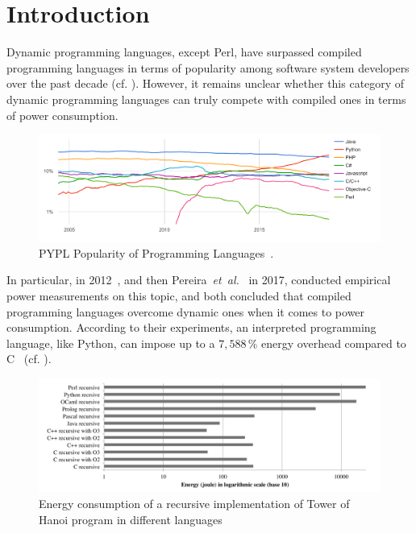 
\section{Introduction}

Dynamic programming languages, except Perl, have surpassed compiled programming languages in terms of popularity among software system developers over the past decade (cf. ).
However, it remains unclear whether this category of dynamic programming languages can truly compete with compiled ones in terms of power consumption.
\begin{figure}[!htb]
    \includegraphics[width=\linewidth]{imgs/programminglanguangespopularity.png}
    \caption{PYPL Popularity of Programming Languages~\cite{noauthor_pypl_2018}.}
    \label{fig:pypl}
\end{figure}

In particular, \citeauthor{noureddine_preliminary_2012} in 2012~\cite{noureddine_preliminary_2012}, and then Pereira~\emph{et~al.}~\cite{pereira_energy_2017} in 2017, conducted empirical power measurements on this topic, and both concluded that compiled programming languages overcome dynamic ones when it comes to power consumption.
According to their experiments, an interpreted programming language, like Python, can impose up to a $7,588\,\%$ energy overhead compared to C~\cite{pereira_energy_2017} (cf. ).
\begin{figure}[!htb]
    \includegraphics[width=\linewidth]{imgs/hannoiimplementation.png}
    \caption{Energy consumption of a recursive implementation of Tower of Hanoi program in different languages~\cite{noureddine_preliminary_2012}}
    \label{fig:hannoi}
\end{figure}



